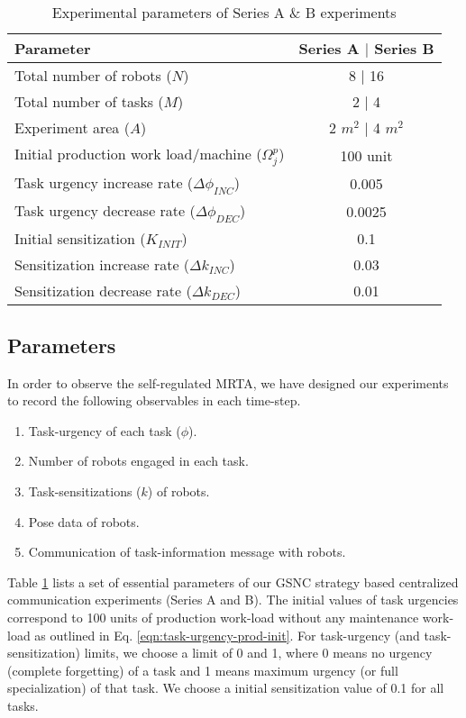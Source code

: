 \documentclass{intech}
\begin{document}
\begin{table}
\caption{Experimental parameters of Series A \& B experiments}
\label{table:params}
\begin{center}
\begin{tabular}{|p{2in}|c|}
\hline Parameter & Series A $\mid$ Series B\\
\hline Total number of robots ($N$) & \hspace*{0.1cm} 8 $\mid$ 16\\
\hline Total number of tasks ($M$) & 2 $\mid$ 4\\
\hline Experiment area ($A$) & 2 $m^2$ $\mid$  4 $m^2$\\
\hline Initial production work load/machine ($\Omega_{j}^{p}$) & 100 unit \\
\hline Task urgency increase rate ($\Delta\phi_{INC}$) & 0.005\\
\hline Task urgency decrease rate ($\Delta\phi_{DEC}$) & 0.0025\\
\hline Initial sensitization ($K_{INIT}$) & 0.1\\
\hline Sensitization increase rate ($\Delta k_{INC}$) & 0.03\\
\hline Sensitization decrease rate ($\Delta k_{DEC}$) & 0.01\\
\hline
\end{tabular}
\end{center}
\end{table}
\subsection{Parameters}
In order to observe the self-regulated MRTA, we have designed our experiments to record the following  observables in each time-step.
\begin{enumerate}
\item Task-urgency of each task ($\phi$).
\item Number of robots engaged in each task.
\item Task-sensitizations ($k$) of robots.
\item Pose data of robots.
\item Communication of task-information message with robots.  
\end{enumerate}
Table \ref{table:params} lists a set of essential parameters of our GSNC strategy based centralized communication experiments (Series A and B). The initial values of task urgencies correspond to 100 units of production work-load without any maintenance work-load as outlined in Eq. \ref{eqn:task-urgency-prod-init}. For task-urgency (and task-sensitization) limits, we choose a limit of 0 and 1, where 0 means no urgency (complete forgetting) of a task and 1 means maximum urgency (or full specialization) of that task. We choose a initial sensitization value of 0.1 for all tasks. 
%
\end{document}
